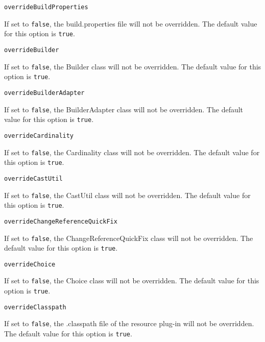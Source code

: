 \noindent\texttt{overrideBuildProperties}
\begin{myindentpar}{1cm}
If set to \texttt{false}, the build.properties file will not be overridden. The default value for this option is \texttt{true}.
\end{myindentpar}

\noindent\texttt{overrideBuilder}
\begin{myindentpar}{1cm}
If set to \texttt{false}, the Builder class will not be overridden. The default value for this option is \texttt{true}.
\end{myindentpar}

\noindent\texttt{overrideBuilderAdapter}
\begin{myindentpar}{1cm}
If set to \texttt{false}, the BuilderAdapter class will not be overridden. The default value for this option is \texttt{true}.
\end{myindentpar}

\noindent\texttt{overrideCardinality}
\begin{myindentpar}{1cm}
If set to \texttt{false}, the Cardinality class will not be overridden. The default value for this option is \texttt{true}.
\end{myindentpar}

\noindent\texttt{overrideCastUtil}
\begin{myindentpar}{1cm}
If set to \texttt{false}, the CastUtil class will not be overridden. The default value for this option is \texttt{true}.
\end{myindentpar}

\noindent\texttt{overrideChangeReferenceQuickFix}
\begin{myindentpar}{1cm}
If set to \texttt{false}, the ChangeReferenceQuickFix class will not be overridden. The default value for this option is \texttt{true}.
\end{myindentpar}

\noindent\texttt{overrideChoice}
\begin{myindentpar}{1cm}
If set to \texttt{false}, the Choice class will not be overridden. The default value for this option is \texttt{true}.
\end{myindentpar}

\noindent\texttt{overrideClasspath}
\begin{myindentpar}{1cm}
If set to \texttt{false}, the .classpath file of the resource plug-in will not be overridden. The default value for this option is \texttt{true}.
\end{myindentpar}

